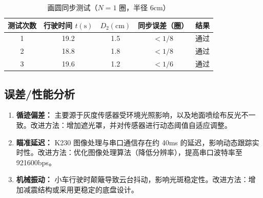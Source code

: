 \documentclass[zihao=-4,fontset=none]{ctexart}
\begin{document}
\begin{table}[H]
    \centering
    \caption{画圆同步测试（$N=1$ 圈，半径 6cm）}
    \label{tab:e_circle}
    \begin{tabular}{ccccc}
        \toprule
        测试次数 & 行驶时间 $t(\text{s})$ & $D_2(\text{cm})$ & 同步误差（圈） & 结果 \\
        \midrule
        1 & 19.2 & 1.5 & $<1/8$ & 通过 \\
        2 & 18.8 & 1.8 & $<1/8$ & 通过 \\
        3 & 19.6 & 1.2 & $<1/6$ & 通过 \\
        \bottomrule
    \end{tabular}
\end{table}

\subsection{误差/性能分析}
\begin{enumerate}
    \item \textbf{循迹偏差：} 主要源于灰度传感器受环境光照影响，以及地面喷绘布反光不一致。改进方法：增加遮光罩，并对传感器进行动态阈值自适应调整。
    \item \textbf{瞄准延迟：} K230 图像处理与串口通信存在约 40ms 的延迟，影响动态跟踪实时性。改进方法：优化图像处理算法（降低分辨率），提高串口波特率至 921600bps。
    \item \textbf{机械振动：} 小车行驶时颠簸导致云台抖动，影响光斑稳定性。改进方法：增加减震结构或采用更稳定的底盘设计。
\end{enumerate}
\end{document}
